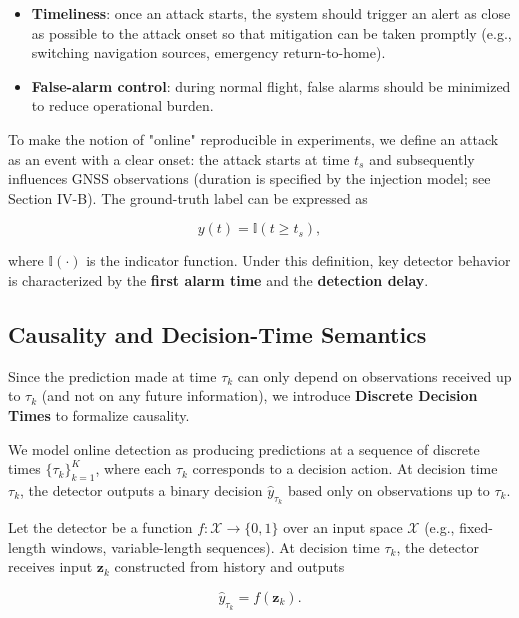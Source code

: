 \documentclass{ieeeaccess}
\begin{document}
\begin{itemize}
\item \textbf{Timeliness}: once an attack starts, the system should trigger an alert as close as possible to the attack onset so that mitigation can be taken promptly (e.g., switching navigation sources, emergency return-to-home).
\item \textbf{False-alarm control}: during normal flight, false alarms should be minimized to reduce operational burden.
\end{itemize}

To make the notion of "online" reproducible in experiments, we define an attack as an event with a clear onset: the attack starts at time \(t_s\) and subsequently influences GNSS observations (duration is specified by the injection model; see Section IV-B). The ground-truth label can be expressed as

\begin{equation}
 y(t) = \mathbb{I}(t \ge t_s),
\end{equation}

where \(\mathbb{I}(\cdot)\) is the indicator function. Under this definition, key detector behavior is characterized by the \textbf{first alarm time} and the \textbf{detection delay}.

\subsection{Causality and Decision-Time Semantics}

Since the prediction made at time \(\tau_k\) can only depend on observations received up to \(\tau_k\) (and not on any future information), we introduce \textbf{Discrete Decision Times} to formalize causality.

We model online detection as producing predictions at a sequence of discrete times \(\{\tau_k\}_{k=1}^K\), where each \(\tau_k\) corresponds to a decision action. At decision time \(\tau_k\), the detector outputs a binary decision \(\hat{y}_{\tau_k}\) based only on observations up to \(\tau_k\).

Let the detector be a function \(f: \mathcal{X} \to \{0,1\}\) over an input space \(\mathcal{X}\) (e.g., fixed-length windows, variable-length sequences). At decision time \(\tau_k\), the detector receives input \(\mathbf{z}_k\) constructed from history and outputs

\begin{equation}
\hat{y}_{\tau_k} = f(\mathbf{z}_k).
\end{equation}
\end{document}
